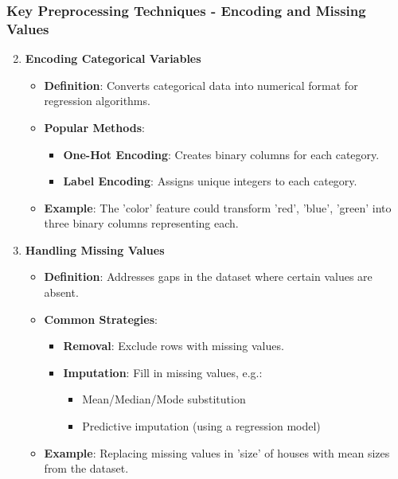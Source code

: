 \documentclass[aspectratio=169]{beamer}
\begin{document}
\begin{frame}[fragile]
    \frametitle{Key Preprocessing Techniques - Encoding and Missing Values}
    \begin{enumerate}
        \setcounter{enumi}{1}
        \item \textbf{Encoding Categorical Variables}
            \begin{itemize}
                \item \textbf{Definition}: Converts categorical data into numerical format for regression algorithms.
                \item \textbf{Popular Methods}:
                    \begin{itemize}
                        \item \textbf{One-Hot Encoding}: Creates binary columns for each category.
                        \item \textbf{Label Encoding}: Assigns unique integers to each category.
                    \end{itemize}
                \item \textbf{Example}: The 'color' feature could transform 'red', 'blue', 'green' into three binary columns representing each.
            \end{itemize}

        \item \textbf{Handling Missing Values}
            \begin{itemize}
                \item \textbf{Definition}: Addresses gaps in the dataset where certain values are absent.
                \item \textbf{Common Strategies}:
                    \begin{itemize}
                        \item \textbf{Removal}: Exclude rows with missing values.
                        \item \textbf{Imputation}: Fill in missing values, e.g.:
                            \begin{itemize}
                                \item Mean/Median/Mode substitution
                                \item Predictive imputation (using a regression model)
                            \end{itemize}
                    \end{itemize}
                \item \textbf{Example}: Replacing missing values in 'size' of houses with mean sizes from the dataset.
            \end{itemize}
    \end{enumerate}
\end{frame}
\end{document}
